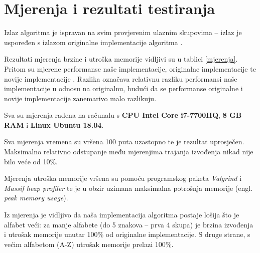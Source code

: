 \documentclass[times, utf8, proizvoljni, numeric]{fer}
\begin{document}
\chapter{Mjerenja i rezultati testiranja}

Izlaz algoritma je ispravan na svim provjerenim ulaznim skupovima -- izlaz je uspoređen s izlazom originalne implementacije algoritma \citep{origimpl}.

Rezultati mjerenja brzine i utroška memorije vidljivi su u tablici \ref{mjerenja}. Pritom su mjerene performanse naše implementacije, originalne implementacije \citep{origimpl} te novije implementacije \citep{newimpl}. Razlika označava relativnu razliku performansi naše implementacije u odnosu na originalnu, budući da se performanse originalne i novije implementacije zanemarivo malo razlikuju.

Sva su mjerenja rađena na računalu s \textbf{CPU Intel Core i7-7700HQ}, \textbf{8 GB RAM} i \textbf{Linux Ubuntu 18.04}.

Sva mjerenja vremena su vršena 100 puta uzastopno te je rezultat uprosječen. Maksimalno relativno odstupanje među mjerenjima trajanja izvođenja nikad nije bilo veće od 10\%.

Mjerenja utroška memorije vršena su pomoću programskog paketa \textit{Valgrind} i \textit{Massif heap profiler} te je u obzir uzimana maksimalna potrošnja memorije (engl. \textit{peak memory usage}).

Iz mjerenja je vidljivo da naša implementacija algoritma postaje lošija što je alfabet veći: za manje alfabete (do 5 znakova -- prva 4 skupa) je brzina izvođenja i utrošak memorije unutar 100\% od originalne implementacije. S druge strane, s većim alfabetom (A-Z) utrošak memorije prelazi 100\%.

\pagebreak
\end{document}
